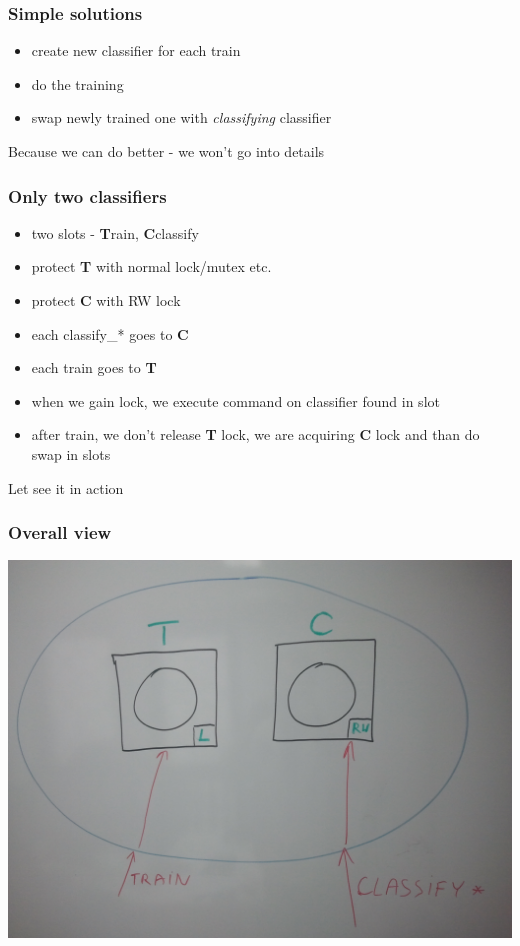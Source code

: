 \documentclass{beamer}
\begin{document}
\begin{frame}
\frametitle{Simple solutions}

\begin{itemize}
 \item create new classifier for each train
 \item do the training
 \item swap newly trained one with \emph{classifying} classifier
\end{itemize}

\pause
\textcolor{RawSienna}{Because we can do better - we won't go into details}

\end{frame}


\begin{frame}
\frametitle{Only two classifiers}

\begin{itemize}
 \item two slots - \textbf{T}rain, \textbf{C}classify
 \item protect \textbf{T} with normal lock/mutex etc.
 \item protect \textbf{C} with RW lock
 \item each classify\_* goes to \textbf{C}
 \item each train goes to \textbf{T}
 \item when we gain lock, we execute command on classifier found in slot
 \item after train, we don't release \textbf{T} lock, we are acquiring \textbf{C} lock and than do swap in slots
\end{itemize}

\pause
\textcolor{JungleGreen}{Let see it in action}

\end{frame}


\begin{frame}
\frametitle{Overall view}
\begin{center}
\includegraphics[scale=0.1]{overall.jpg} 
\end{center}
\end{frame}
\end{document}
